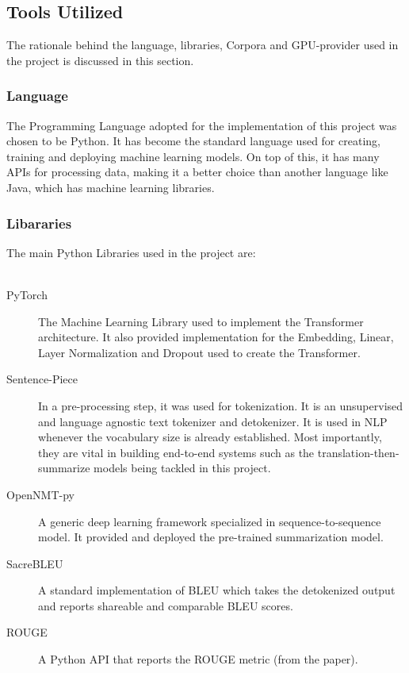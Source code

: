 \documentclass[12pt,a4paper,twoside,openright]{report}
\begin{document}
\subsection{Tools Utilized}
\label{tools-utilized}

The rationale behind the language, libraries, Corpora and GPU-provider used in the project is discussed in this section. 

\subsubsection{Language}
The Programming Language adopted for the implementation of this project was chosen to be Python. It has become the standard language used for creating, training and deploying machine learning models. On top of this, it has many APIs for processing data, making it a better choice than another language like Java, which has machine learning libraries. 

\subsubsection{Libararies}
The main Python Libraries used in the project are: 
\\\\
\begin{description}
\item[PyTorch \cite{torch}]
The Machine Learning Library used to implement the Transformer architecture. It also provided implementation for the Embedding, Linear, Layer Normalization and Dropout used to create the Transformer. 
\item[Sentence-Piece \cite{sentencepiece}]
In a pre-processing step, it was used for tokenization. It is an unsupervised and language agnostic text tokenizer and detokenizer. It is used in NLP whenever the vocabulary size is already established. Most importantly, they are vital in building end-to-end systems such as the translation-then-summarize models being tackled in this project.  
\item[OpenNMT-py]
A generic deep learning framework specialized in sequence-to-sequence model. It provided and deployed the pre-trained summarization model.
\item[SacreBLEU \cite{sacrebleu}]
A standard implementation of BLEU \cite{bleu} which takes the detokenized output and reports shareable and comparable BLEU scores. 
\item[ROUGE]
A Python API that reports the ROUGE metric (from the paper\cite{rouge}). 

\end{description}
\end{document}
